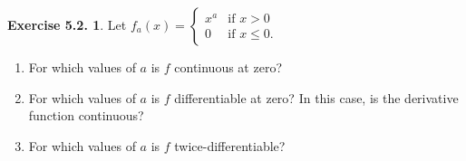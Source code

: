 \documentclass[12pt]{article}
\theoremstyle{definition}
\theoremstyle{exercise}
\newtheorem{exercise}{Exercise 5.2.}
\theoremstyle{solution}
\begin{document}
\begin{exercise}
\label{ex:5}
    Let \( f_a(x) = \begin{cases}
        x^a & \text{if } x > 0 \\
        0 & \text{if } x \leq 0.
    \end{cases} \)
    \begin{enumerate}
        \item For which values of \( a \) is \( f \) continuous at zero?

        \item For which values of \( a \) is \( f \) differentiable at zero? In this case, is the derivative function continuous?

        \item For which values of \( a \) is \( f \) twice-differentiable?
    \end{enumerate}
\end{exercise}
\end{document}
